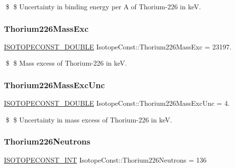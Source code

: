 \$ \$ Uncertainty in binding energy per A of Thorium-\/226 in keV. \mbox{\label{group___isotope_const-_thorium-_th226_ga1500bf700707df60d84af928bdbf8795}} 
\subsubsection{\texorpdfstring{Thorium226\+Mass\+Exc}{Thorium226MassExc}}
{\footnotesize\ttfamily \mbox{\hyperlink{group___isotope_const-_macros_ga8f45a7272ce02c0b4c65c44636ed719a}{I\+S\+O\+T\+O\+P\+E\+C\+O\+N\+S\+T\+\_\+\+D\+O\+U\+B\+LE}} Isotope\+Const\+::\+Thorium226\+Mass\+Exc = 23197.}

\$ \$ Mass excess of Thorium-\/226 in keV. \mbox{\label{group___isotope_const-_thorium-_th226_ga8b1a084ff4a5c94424b780ee23abb93e}} 
\subsubsection{\texorpdfstring{Thorium226\+Mass\+Exc\+Unc}{Thorium226MassExcUnc}}
{\footnotesize\ttfamily \mbox{\hyperlink{group___isotope_const-_macros_ga8f45a7272ce02c0b4c65c44636ed719a}{I\+S\+O\+T\+O\+P\+E\+C\+O\+N\+S\+T\+\_\+\+D\+O\+U\+B\+LE}} Isotope\+Const\+::\+Thorium226\+Mass\+Exc\+Unc = 4.}

\$ \$ Uncertainty in mass excess of Thorium-\/226 in keV. \mbox{\label{group___isotope_const-_thorium-_th226_ga9310bac16324a36954226e6164083b82}} 
\subsubsection{\texorpdfstring{Thorium226\+Neutrons}{Thorium226Neutrons}}
{\footnotesize\ttfamily \mbox{\hyperlink{group___isotope_const-_macros_ga5f18360b3e99483a35c32d789e62621c}{I\+S\+O\+T\+O\+P\+E\+C\+O\+N\+S\+T\+\_\+\+I\+NT}} Isotope\+Const\+::\+Thorium226\+Neutrons = 136}


